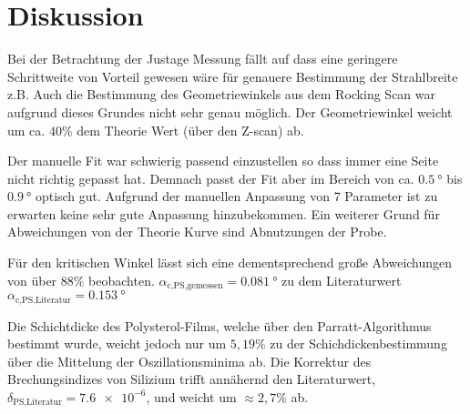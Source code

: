 \section{Diskussion}
\label{sec:Diskussion}


Bei der Betrachtung der Justage Messung fällt auf dass eine geringere Schrittweite
von Vorteil gewesen wäre für genauere Bestimmung der Strahlbreite z.B.
Auch die Bestimmung des Geometriewinkels aus dem Rocking Scan war aufgrund dieses Grundes
nicht sehr genau möglich. 
Der Geometriewinkel weicht um ca. $40 \%$ dem Theorie Wert (über den Z-scan) ab.

Der manuelle Fit war schwierig passend einzustellen so dass immer eine Seite
nicht richtig gepasst hat.
Demnach passt der Fit aber im Bereich von ca. $\SI{0.5}{\degree}$ bis $\SI{0.9}{\degree}$
optisch gut.
Aufgrund der manuellen Anpassung von 7 Parameter ist zu erwarten
keine sehr gute Anpassung hinzubekommen.
Ein weiterer Grund für Abweichungen von der Theorie Kurve sind Abnutzungen der Probe.

Für den kritischen Winkel lässt sich eine 
dementsprechend große Abweichungen von über 
$88 \%$ beobachten.  
$\alpha_\text{c,PS,gemessen} = \SI{0.081}{\degree}$ zu dem Literaturwert 
$\alpha_\text{c,PS,Literatur} = \SI{0.153}{\degree}$\cite{anleitung} 

Die Schichtdicke des Polysterol-Films, welche über den Parratt-Algorithmus bestimmt wurde,
 weicht jedoch nur um $5,19 \%$ zu der Schichdickenbestimmung über die Mittelung der Oszillationsminima ab.
Die Korrektur des Brechungsindizes von Silizium trifft annähernd den Literaturwert, $\delta_\text{PS,Literatur} = \num{7.6e-6}$\cite{anleitung},
 und weicht um $\approx 2,7 \%$ ab.




